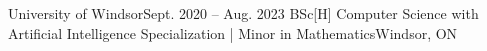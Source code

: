 \resumeSubheading
{University of Windsor}{Sept. 2020 -- Aug. 2023}
{BSc[H] Computer Science with Artificial Intelligence Specialization | Minor in Mathematics}{Windsor, ON}
\resumeItemListStart
\resumeItemListEnd